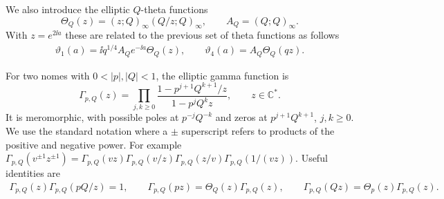 We also introduce the elliptic $Q$-theta functions
\begin{equation}
  \Theta_Q(z)=(z;Q)_\infty(Q/z;Q)_\infty,\qquad
  A_Q=(Q;Q)_\infty.
  \label{eq:multiplicative-theta}
\end{equation}
With $z=e^{2\ii a}$ these are related to the previous set of theta functions as
follows
\begin{equation}
  \begin{gathered}
    \vartheta_1(a)=\ii q^{1/4}A_Qe^{-\ii a}\Theta_Q(z),
    \qquad \vartheta_4(a)=A_Q\Theta_Q(qz).
  \end{gathered}
  \label{eq:jacobi-dictionary}
\end{equation}

For two nomes with $0<|p|,|Q|<1$, the elliptic gamma function is
\begin{equation}
  \Gamma_{p,Q}(z)
  =\prod_{j,k\geq0}
  \frac{1-p^{j+1}Q^{k+1}/z}{1-p^jQ^kz},\qquad z\in\mathbb C^*.
  \label{eq:elliptic-gamma}
\end{equation}
It is meromorphic, with possible poles at $p^{-j}Q^{-k}$ and
zeros at $p^{j+1}Q^{k+1}$, $j,k\geq0$.
We use the standard notation where a $\pm$ superscript refers to products of the
positive and negative power. For example
$\Gamma_{p,Q}(v^{\pm1}z^{\pm1})
  =\Gamma_{p,Q}(vz)\Gamma_{p,Q}(v/z)
  \Gamma_{p,Q}(z/v)\Gamma_{p,Q}(1/(vz))$.
Useful identities are
\begin{equation}
  \begin{gathered}
    \Gamma_{p,Q}(z)\Gamma_{p,Q}(pQ/z)=1,\qquad
    \Gamma_{p,Q}(pz)=\Theta_Q(z)\Gamma_{p,Q}(z),\qquad
    \Gamma_{p,Q}(Qz)=\Theta_p(z)\Gamma_{p,Q}(z).
  \end{gathered}
  \label{eq:gamma-identities}
\end{equation}

